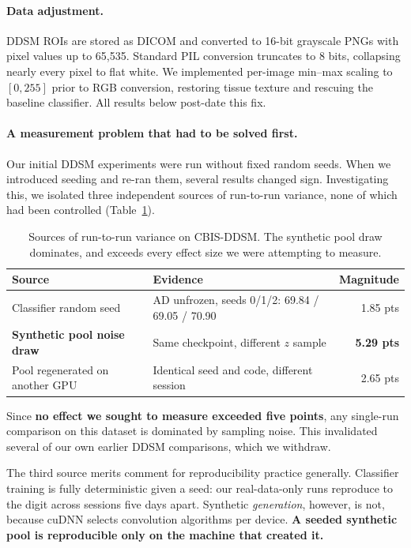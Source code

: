 \paragraph{Data adjustment.} DDSM ROIs are stored as DICOM and converted to 16-bit grayscale PNGs with
pixel values up to 65{,}535. Standard PIL conversion truncates to 8 bits, collapsing nearly every pixel
to flat white. We implemented per-image min--max scaling to $[0,255]$ prior to RGB conversion,
restoring tissue texture and rescuing the baseline classifier. All results below post-date this fix.

\paragraph{A measurement problem that had to be solved first.} Our initial DDSM experiments were run
without fixed random seeds. When we introduced seeding and re-ran them, several results changed sign.
Investigating this, we isolated three independent sources of run-to-run variance, none of which had
been controlled (Table~\ref{tab:ddsm_variance}).

\begin{table}[h]
\centering
\caption{Sources of run-to-run variance on CBIS-DDSM. The synthetic pool draw dominates, and exceeds
every effect size we were attempting to measure.}
\label{tab:ddsm_variance}
\begin{tabular}{llr}
\toprule
\textbf{Source} & \textbf{Evidence} & \textbf{Magnitude} \\
\midrule
Classifier random seed & AD unfrozen, seeds 0/1/2: 69.84 / 69.05 / 70.90 & 1.85 pts \\
\textbf{Synthetic pool noise draw} & Same checkpoint, different $z$ sample & \textbf{5.29 pts} \\
Pool regenerated on another GPU & Identical seed and code, different session & 2.65 pts \\
\bottomrule
\end{tabular}
\end{table}

Since \textbf{no effect we sought to measure exceeded five points}, any single-run comparison on this
dataset is dominated by sampling noise. This invalidated several of our own earlier DDSM comparisons,
which we withdraw.

The third source merits comment for reproducibility practice generally. Classifier training is fully
deterministic given a seed: our real-data-only runs reproduce to the digit across sessions five days
apart. Synthetic \emph{generation}, however, is not, because cuDNN selects convolution algorithms per
device. \textbf{A seeded synthetic pool is reproducible only on the machine that created it.}

